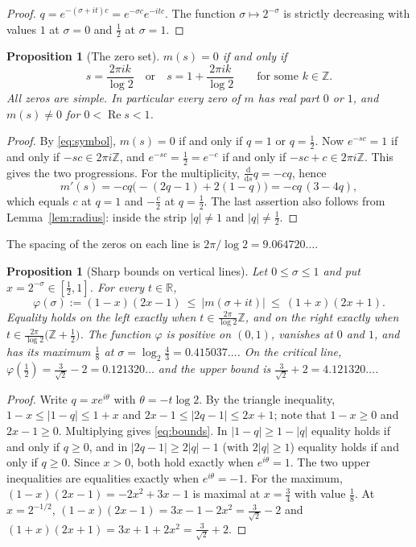 \documentclass[11pt]{amsart}
\newtheorem{proposition}[theorem]{Proposition}
\theoremstyle{definition}
\theoremstyle{remark}
\DeclareMathOperator{\re}{Re}
\newcommand{\R}{\mathbb{R}}
\newcommand{\Z}{\mathbb{Z}}
\begin{document}
\begin{proof}
$q=e^{-(\sigma+it)c}=e^{-\sigma c}e^{-itc}$. The function $\sigma\mapsto 2^{-\sigma}$ is strictly
decreasing with values $1$ at $\sigma=0$ and $\tfrac12$ at $\sigma=1$.
\end{proof}

\begin{proposition}[The zero set]\label{prop:zeros}
$m(s)=0$ if and only if
\[
s=\frac{2\pi i k}{\log 2}\quad\text{or}\quad s=1+\frac{2\pi i k}{\log 2}\qquad\text{for some }k\in\Z .
\]
All zeros are simple. In particular every zero of $m$ has real part $0$ or $1$, and
$m(s)\neq0$ for $0<\re s<1$.
\end{proposition}

\begin{proof}
By \eqref{eq:symbol}, $m(s)=0$ if and only if $q=1$ or $q=\tfrac12$. Now $e^{-sc}=1$ if and only if
$-sc\in 2\pi i\Z$, and $e^{-sc}=\tfrac12=e^{-c}$ if and only if $-sc+c\in2\pi i\Z$. This gives the
two progressions. For the multiplicity, $\tfrac{\mathrm d}{\mathrm ds}q=-cq$, hence
\begin{equation}\label{eq:derivative}
m'(s)=-cq\bigl(-(2q-1)+2(1-q)\bigr)=-cq\,(3-4q),
\end{equation}
which equals $c$ at $q=1$ and $-\tfrac c2$ at $q=\tfrac12$. The last assertion also follows from
Lemma~\ref{lem:radius}: inside the strip $|q|\ne1$ and $|q|\ne\tfrac12$.
\end{proof}

The spacing of the zeros on each line is $2\pi/\log2=9.064720\ldots$.

\begin{proposition}[Sharp bounds on vertical lines]\label{prop:bounds}
Let $0\le\sigma\le1$ and put $x=2^{-\sigma}\in[\tfrac12,1]$. For every $t\in\R$,
\begin{equation}\label{eq:bounds}
\varphi(\sigma):=(1-x)(2x-1)\ \le\ |m(\sigma+it)|\ \le\ (1+x)(2x+1).
\end{equation}
Equality holds on the left exactly when $t\in\frac{2\pi}{\log 2}\Z$, and on the right exactly when
$t\in\frac{2\pi}{\log 2}\bigl(\Z+\tfrac12\bigr)$. The function $\varphi$ is positive on $(0,1)$,
vanishes at $0$ and $1$, and has its maximum $\tfrac18$ at $\sigma=\log_2\tfrac43=0.415037\ldots$.
On the critical line, $\varphi(\tfrac12)=\tfrac{3}{\sqrt2}-2=0.121320\ldots$ and the upper bound is
$\tfrac{3}{\sqrt2}+2=4.121320\ldots$.
\end{proposition}

\begin{proof}
Write $q=xe^{i\theta}$ with $\theta=-t\log2$. By the triangle inequality,
$1-x\le|1-q|\le1+x$ and $2x-1\le|2q-1|\le2x+1$; note that $1-x\ge0$ and $2x-1\ge0$. Multiplying
gives \eqref{eq:bounds}. In $|1-q|\ge 1-|q|$ equality holds if and only if $q\ge0$, and in
$|2q-1|\ge2|q|-1$ (with $2|q|\ge1$) equality holds if and only if $q\ge 0$. Since $x>0$, both hold
exactly when $e^{i\theta}=1$. The two upper inequalities are equalities exactly when
$e^{i\theta}=-1$. For the maximum, $(1-x)(2x-1)=-2x^2+3x-1$ is maximal at $x=\tfrac34$ with value
$\tfrac18$. At $x=2^{-1/2}$, $(1-x)(2x-1)=3x-1-2x^2=\tfrac{3}{\sqrt2}-2$ and
$(1+x)(2x+1)=3x+1+2x^2=\tfrac{3}{\sqrt2}+2$.
\end{proof}
\end{document}
